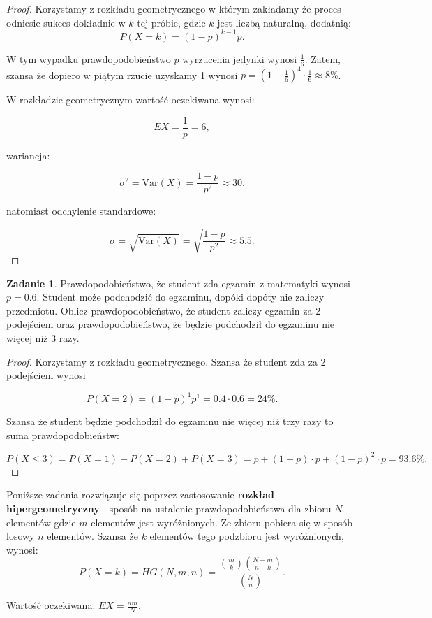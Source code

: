 \documentclass[11pt]{article}
\theoremstyle{definition}
\newtheorem{zadanie}{Zadanie}
\numberwithin{zadanie}{section}
\begin{document}
\begin{proof}
    Korzystamy z rozkładu geometrycznego w którym zakładamy że proces odniesie sukces dokładnie w $k$-tej próbie, gdzie $k$ jest liczbą naturalną, dodatnią:
    $$P(X=k) = (1-p)^{k-1}p.$$

    W tym wypadku prawdopodobieństwo $p$ wyrzucenia jedynki wynosi $\frac16$. Zatem, szansa że dopiero w piątym rzucie uzyskamy 1 wynosi $p=(1-\frac16)^4\cdot\frac16\approx 8\%$.

    W rozkładzie geometrycznym wartość oczekiwana wynosi:

    $$EX = \frac1p=6,$$

    wariancja:

    $$\sigma^2 = \text{Var}(X) = \frac{1-p}{p^2}\approx 30.$$

    natomiast odchylenie standardowe:

    $$\sigma = \sqrt{\text{Var}(X)} = \sqrt{\frac{1-p}{p^2}}\approx 5.5.$$
\end{proof}
\begin{zadanie}
    Prawdopodobieństwo, że student zda egzamin z matematyki wynosi $p=0.6$. Student może podchodzić do egzaminu,
    dopóki dopóty nie zaliczy przedmiotu. Oblicz prawdopodobieństwo, że student zaliczy egzamin za 2 podejściem oraz
    prawdopodobieństwo, że będzie podchodził do egzaminu nie więcej niż 3 razy.
\end{zadanie}
\begin{proof}
    Korzystamy z rozkładu geometrycznego. Szansa że student zda za 2 podejściem wynosi

    $$P(X=2) = (1-p)^1p^1=0.4\cdot0.6=24\%.$$

    Szansa że student będzie podchodził do egzaminu nie więcej niż trzy razy to suma prawdopodobieństw:

    $$P(X\leq3) = P(X=1)+P(X=2)+P(X=3) = p+(1-p)\cdot p + (1-p)^2\cdot p = 93.6\%.$$

\end{proof}

Poniższe zadania rozwiązuje się poprzez zastosowanie \textbf{rozkład hipergeometryczny} - sposób na ustalenie prawdopodobieństwa dla zbioru $N$ elementów gdzie $m$ elementów jest wyróżnionych. Ze zbioru pobiera się w sposób losowy $n$ elementów. Szansa że $k$ elementów tego podzbioru jest wyróżnionych, wynosi:
$$P(X=k)=HG(N,m,n)=\frac{\binom mk\binom{N-m}{n-k}}{\binom Nn}.$$

Wartość oczekiwana: $EX = \frac{nm}N.$
\end{document}
